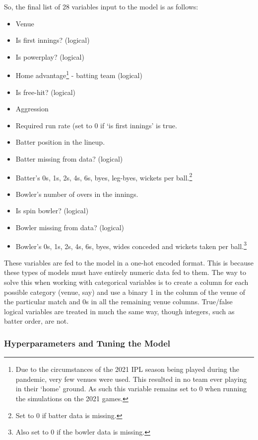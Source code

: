 So, the final list of 28 variables input to the model is as follows:
\begin{itemize}
    \itemsep-0.25em
    \renewcommand\labelitemi{-}
    \item Venue
    \item Is first innings? (logical)
    \item Is powerplay? (logical)
    \item Home advantage\footnote{Due to the circumstances of the 2021 IPL season being played during the pandemic, very few venues were used. This resulted in no team ever playing in their `home' ground. As such this variable remains set to 0 when running the simulations on the 2021 games.} - batting team (logical)
    \item Is free-hit? (logical)
    \item Aggression
    \item Required run rate (set to 0 if `is first innings' is true.
    \item Batter position in the lineup.
    \item Batter missing from data? (logical)
    \item Batter's 0s, 1s, 2s, 4s, 6s, byes, leg-byes, wickets per ball.\footnote{Set to 0 if batter data is missing.}
    \item Bowler's number of overs in the innings.
    \item Is spin bowler? (logical)
    \item Bowler missing from data? (logical)
    \item Bowler's 0s, 1s, 2s, 4s, 6s, byes, wides conceded and wickets taken per ball.\footnote{Also set to 0 if the bowler data is missing.}
\end{itemize}

These variables are fed to the model in a one-hot encoded format. This is because these types of models must have entirely numeric data fed to them. The way to solve this when working with categorical variables is to create a column for each possible category (venue, say) and use a binary 1 in the column of the venue of the particular match and 0s in all the remaining venue columns. True/false logical variables are treated in much the same way, though integers, such as batter order, are not.

\subsubsection{Hyperparameters and Tuning the Model}

